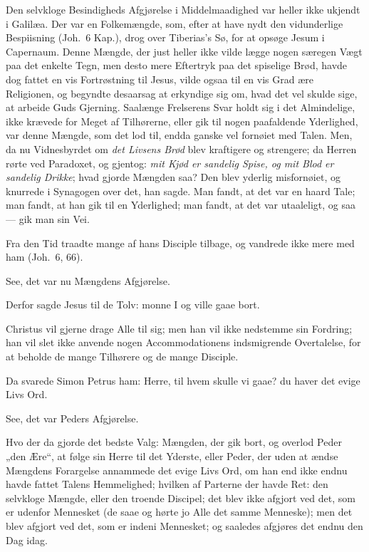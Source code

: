 \documentclass[12pt,a4paper]{book}
\begin{document}
Den selvkloge Besindigheds Afgjørelse i Middelmaadighed var heller ikke ukjendt i
Galilæa. Der var en Folkemængde, som, efter at have nydt den vidunderlige
Bespiisning (Joh.\ 6 Kap.),
drog over Tiberias's Sø, for at opsøge Jesum i Capernaum. Denne Mængde, der just
heller ikke vilde lægge nogen særegen Vægt paa det enkelte Tegn, men desto mere
Eftertryk paa det spiselige Brød, havde dog fattet en vis Fortrøstning til Jesus,
vilde ogsaa til en vis Grad ære Religionen, og begyndte desaarsag at erkyndige
sig om, hvad det vel skulde sige, at arbeide Guds Gjerning. Saalænge Frelserens
Svar holdt sig i det Almindelige, ikke krævede for Meget af Tilhørerne, eller gik
til nogen paafaldende Yderlighed, var denne Mængde, som det lod til, endda ganske
vel fornøiet med Talen. Men, da nu Vidnesbyrdet om \emph{det Livsens Brød} blev
kraftigere og strengere; da Herren rørte ved Paradoxet, og gjentog: \emph{mit
Kjød er sandelig Spise, og mit Blod er sandelig Drikke}; hvad gjorde Mængden saa?
Den blev yderlig misfornøiet, og knurrede i Synagogen over det, han sagde. Man
fandt, at det var en haard Tale; man fandt, at han gik til en Yderlighed; man
fandt, at det var utaaleligt, og saa --- gik man sin Vei.

\begingroup\large
Fra den Tid traadte mange af hans Disciple tilbage, og vandrede ikke mere med ham
(Joh.\ 6, 66).
\par\endgroup

See, det var nu Mængdens Afgjørelse.

\begingroup\large
Derfor sagde Jesus til de Tolv: monne I og ville gaae bort.
\par\endgroup

Christus vil gjerne drage Alle til sig; men han vil ikke nedstemme sin Fordring;
han vil slet ikke anvende nogen Accommodationens indsmigrende Overtalelse, for at
beholde de mange Tilhørere og de mange Disciple.

\begingroup\large
Da svarede Simon Petrus ham: Herre, til hvem skulle vi gaae? du haver det evige
Livs Ord.
\par\endgroup

See, det var Peders Afgjørelse.

Hvo der da gjorde det bedste Valg: Mængden, der gik bort,
og overlod Peder „den Ære“, at følge sin Herre til det Yderste, eller Peder, der
uden at ændse Mængdens Forargelse annammede det evige Livs Ord, om han end ikke
endnu havde fattet Talens Hemmelighed; hvilken af Parterne der havde Ret: den
selvkloge Mængde, eller den troende Discipel; det blev ikke afgjort ved det, som
er udenfor Mennesket (de saae og hørte jo Alle det samme Menneske); men det blev
afgjort ved det, som er indeni Mennesket; og saaledes afgjøres det endnu den Dag
idag.
\end{document}
